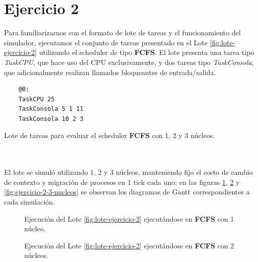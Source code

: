 \section{Ejercicio 2}

Para familiarizarnos con el formato de lote de tareas y el funcionamiento del simulador, ejecutamos el conjunto de tareas presentado en el Lote \ref{fig:lote-ejercicio-2} utilizando el scheduler de tipo \textbf{FCFS}. El lote presenta una tarea tipo \textit{TaskCPU}, que hace uso del CPU exclusivamente, y dos tareas tipo \textit{TaskConsola}, que adicionalmente realizan llamados bloqueantes de entrada/salida.

\begin{minipage}[t]{0.5\textwidth}
  \begin{tarea}[H]
    \vspace*{2mm}
    \begin{verbatim}
    @0:
    TaskCPU 25
    TaskConsola 5 1 11
    TaskConsola 10 2 3
    \end{verbatim}
    \vspace*{-5mm}
  \caption{Lote de tareas para evaluar el scheduler \textbf{FCFS} con 1, 2 y 3 núcleos.}
  \label{fig:lote-ejercicio-2}
  \end{tarea}
\end{minipage}\\\\

El lote se simuló utilizando 1, 2 y 3 núcleos, manteniendo fijo el costo de cambio de contexto y migración de procesos en 1 tick cada uno; en las figuras \ref{fig:ejercicio-2-1-nucleos}, \ref{fig:ejercicio-2-2-nucleos} y \ref{fig:ejercicio-2-3-nucleos} se observan los diagramas de Gantt correspondientes a cada simulación.

\begin{figure}[h!t]
  \centering
  \caption{Ejecución del Lote \ref{fig:lote-ejercicio-2} ejecutándose en \textbf{FCFS} con 1 núcleo.}
  \label{fig:ejercicio-2-1-nucleos}
\end{figure}

\begin{figure}[h!t]
  \centering
  \caption{Ejecución del Lote \ref{fig:lote-ejercicio-2} ejecutándose en \textbf{FCFS} con 2 núcleos.}
  \label{fig:ejercicio-2-2-nucleos}
\end{figure}

